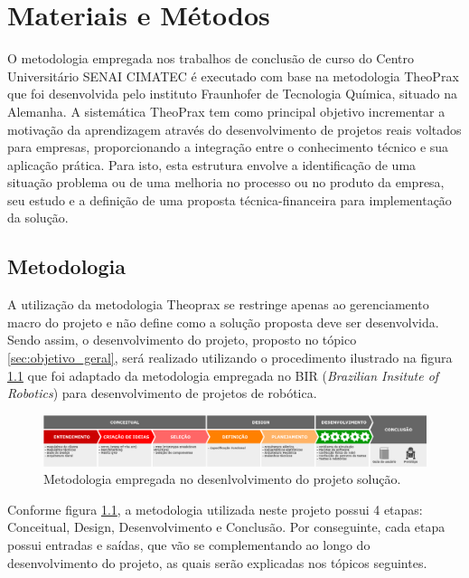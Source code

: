 \chapter{Materiais e Métodos}
\label{chap:materiais_metodos}
O metodologia empregada nos trabalhos de conclusão de curso do Centro Universitário SENAI CIMATEC é executado com base na metodologia TheoPrax que foi desenvolvida pelo instituto Fraunhofer de Tecnologia Química, situado na Alemanha. A sistemática TheoPrax tem como principal objetivo incrementar a motivação da aprendizagem através do desenvolvimento de projetos reais voltados para empresas, proporcionando a integração entre o conhecimento técnico e sua aplicação prática. Para isto, esta estrutura envolve a identificação de uma situação problema ou de uma melhoria no processo ou no produto da empresa, seu estudo e a definição de uma proposta técnica-financeira para implementação da solução.

\section{Metodologia}
\label{sec:metodologia}
A utilização da metodologia Theoprax se restringe apenas ao gerenciamento macro do projeto e não define como a solução proposta deve ser desenvolvida. Sendo assim, o desenvolvimento do projeto, proposto no tópico \ref{sec:objetivo_geral}, será realizado utilizando o procedimento ilustrado na figura \ref{fig:metodologia_diagrama} que foi adaptado da metodologia empregada no BIR (\textit{Brazilian Insitute of Robotics}) para desenvolvimento de projetos de robótica.

\begin{figure}[H]
	\label{fig:metodologia_diagrama}
	\centering
	\caption{Metodologia empregada no desenlvolvimento do projeto solução.}
	\includegraphics[width=1\textwidth]
	{Figures/metodologia_diagrama}
\end{figure}	

Conforme figura \ref{fig:metodologia_diagrama}, a metodologia utilizada neste projeto possui 4 etapas: Conceitual, Design, Desenvolvimento e Conclusão. Por conseguinte, cada etapa possui entradas e saídas, que vão se complementando ao longo do desenvolvimento do projeto, as quais serão explicadas nos tópicos seguintes.

